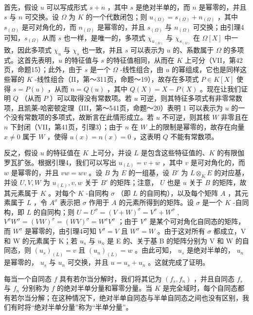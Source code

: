 首先，假设 \(u\) 可以写成形式 \(s + n\) ，其中 \(s\) 是绝对半单的，而 \(n\) 是幂零的，并且 \(s\) 与 \(n\) 可交换。设 \(\Omega\) 为 \(K\) 的一个代数闭包；则 \(u_{(\Omega)} = s_{(\Omega)} + n_{(\Omega)}\) ，其中 \(s_{(\Omega)}\) 是可对角化的，而 \(n_{(\Omega)}\) 是幂零的，并且 \(s_{(\Omega)}\) 与 \(n_{(\Omega)}\) 可交换；由引理4可知，\(s_{(\Omega)}\) 从而 \(s\) 也一样，是唯一的，多项式 \(\chi_{u_{(\Omega)}}\) 与 \(\chi_{s_{(\Omega)}}\) 在 \(\Omega[X]\) 中一致，因此多项式 \(\chi_u\) 与 \(\chi_s\) 也一致，并且 \(s\) 可以表示为 \(u\) 的、系数属于 \(\Omega\) 的多项式。这首先表明，\(u\) 的特征值与 \(s\) 的特征值相同，从而在 \(K\) 上可分（VII，第42页，命题15）；此外，由于 \(s\) 是一个 \(\Omega\) -线性组合，由 \(u\) 的幂组成，它也是同样这些幂的 \(K\) -线性组合（II，第～311页，命题～19），故存在多项式 \(P \in K[X]\) 使得 \(s = P(u)\) ，从而 \(n = Q(u)\) ，其中 \(Q(X) = X - P(X)\) 。现在让我们证明 \(Q\) （从而 \(P\) ）可以取得没有常数项。若 \(u\) 可逆，则其特征多项式有非零常数项，且凯莱-哈密顿定理（III，第～541页，命题～20）表明 1 可以表示为 \(u\) 的一个没有常数项的多项式，故断言在此情形成立。若 \(u\) 不可逆，则其核 \(W\) 非零且在 \(n\) 下封闭（VII，第41页，引理3）；由于 \(n\) 在 \(W\) 上的限制是幂零的，故存在向量 \(x \neq 0\) 属于 \(W\) ，使得 \(u(x) = n(x) = 0\) ，这表明 \(Q\) 不能有常数项。

反之，假设 \(u\) 的特征值在 \(K\) 上可分，并设 \(L\) 是包含这些特征值的、\(K\) 的有限伽罗瓦扩张。根据引理4，我们可以写出 \(u_{(L)} = v + w\) ，其中 \(v\) 是可对角化的，而 \(w\) 是幂零的，并且 \(vw = wv\) 。设 \(B\) 为 \(E\) 的一组基，设 \(B'\) 为 \(L \otimes_K E\) 的对应基，并设 \(U, V, W\) 为 \(u_{(L)}, v, w\) 关于 \(B'\) 的矩阵；注意， \(U\) 也是 \(u\) 关于 \(B\) 的矩阵，故其元素属于 \(K\) 。对每个 \(K\) -自同构 \(\sigma\) （即 \(L\) 的自同构），以及每个矩阵 \(A\) ，其元素属于 \(L\) ，令 \(A^\sigma\) 表示把 \(\sigma\) 作用于 \(A\) 的元素所得到的矩阵。设 \(\sigma\) 是一个 \(K\) -自同构，即 \(L\) 的自同构；则 \(U = U^\sigma = (V + W)^\sigma = V^\sigma + W^\sigma\) , \(V^\sigma W^\sigma = (VW)^\sigma = (WV)^\sigma = W^\sigma V^\sigma\) ；由于 \(V^\sigma\) 是某个可对角化自同态的矩阵，而 \(W^\sigma\) 是幂零的，由引理4可知 \(V^\sigma = V\) 且 \(W^\sigma = W\) 。由于这对所有 \(\sigma\) 都成立，V 和 W 的元素属于 K；若 \(u_{s}\) 与 \(u_{n}\) 是 E 的、关于基 B 的矩阵分别为 V 和 W 的自同态，则 \((u_{s})_{(L)} = v\) 且 \((u_{n})_{(L)} = w\) 。由此可知， \(u_{s}\) 是绝对半单的， \(u_{n}\) 是幂零的， \(u_{s}\) 与 \(u_{n}\) 可交换，并且 \(u = u_{s} + u_{n}\) 。这就完成了证明。

每当一个自同态 \(f\) 具有若尔当分解时，我们将其记为 \((f_s, f_n)\) ，并且自同态 \(f_s\) 与 \(f_n\) 分别称为 \(f\) 的绝对半单分量和幂零分量。当 \(K\) 是完全域时，每个自同态都有若尔当分解；在这种情况下，绝对半单自同态与半单自同态之间也没有区别，我们有时将“绝对半单分量”称为“半单分量”。

